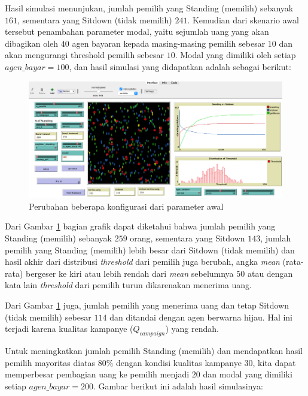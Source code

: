 Hasil simulasi menunjukan, jumlah pemilih yang Standing (memilih) sebanyak $161$, sementara yang Sitdown (tidak memilih) $241$. Kemudian dari skenario awal tersebut penambahan parameter modal, yaitu sejumlah uang yang akan dibagikan oleh $40$ agen bayaran kepada masing-masing pemilih sebesar $10$ dan akan mengurangi threshold pemilih sebesar $10$. Modal yang dimiliki oleh setiap $agen\_bayar=100$, dan hasil simulasi yang didapatkan adalah sebagai berikut:

\begin{figure}[H]
\centering
\includegraphics[width=\linewidth]{images/ch03/pemilusop8}
\caption{Perubahan beberapa konfigurasi dari parameter awal}
\label{fig:pemilusop8}
\end{figure}

Dari Gambar \ref{fig:pemilusop8} bagian grafik dapat diketahui bahwa jumlah pemilih yang Standing (memilih) sebanyak $259$ orang, sementara yang Sitdown $143$, jumlah pemilih yang Standing (memilih) lebih besar dari Sitdown (tidak memilih) dan hasil akhir dari distribusi \textit{threshold} dari pemilih juga berubah, angka \textit{mean} (rata-rata) bergeser ke kiri atau lebih rendah dari \textit{mean} sebelumnya $50$ atau dengan kata lain \textit{threshold} dari pemilih turun dikarenakan menerima uang.

Dari Gambar \ref{fig:pemilusop8} juga, jumlah pemilih yang menerima uang dan tetap Sitdown (tidak memilih) sebesar $114$ dan ditandai dengan agen berwarna hijau. Hal ini terjadi karena kualitas kampanye ($Q_{campaign}$) yang rendah.

Untuk meningkatkan jumlah pemilih Standing (memilih) dan mendapatkan hasil pemilih mayoritas diatas $80\%$ dengan kondisi kualitas kampanye $30$, kita dapat memperbesar pembagian uang ke pemilih menjadi $20$ dan modal yang dimiliki setiap $agen\_bayar=200$. Gambar berikut ini adalah hasil simulasinya:

